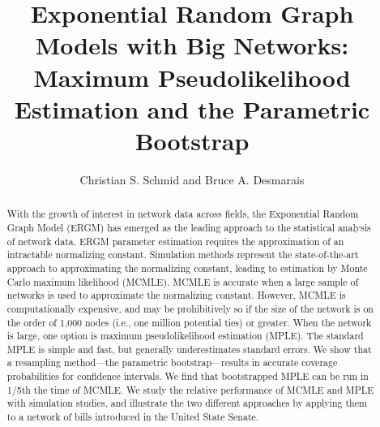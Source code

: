 \documentclass{llncs}
\begin{document}

\title{Exponential Random Graph Models with Big Networks: Maximum Pseudolikelihood Estimation and the Parametric Bootstrap}

\author{Christian S. Schmid and Bruce A. Desmarais}

\maketitle

\begin{abstract}
With the growth of interest in network data across fields, the Exponential Random Graph Model (ERGM) has emerged as the leading approach to the statistical analysis of network data. ERGM parameter estimation requires the approximation of an intractable normalizing constant. Simulation methods represent the state-of-the-art approach to approximating the normalizing constant, leading to estimation by Monte Carlo maximum likelihood (MCMLE). MCMLE is accurate when a large sample of networks is used to approximate the normalizing constant. However, MCMLE is computationally expensive, and may be prohibitively so if the size of the network is on the order of 1,000 nodes (i.e., one million potential ties) or greater. When the network is large, one option is maximum pseudolikelihood estimation (MPLE). The standard MPLE is simple and fast, but generally underestimates standard errors. We show that a resampling method---the parametric bootstrap---results in accurate coverage probabilities for confidence intervals. We find that bootstrapped MPLE can be run in 1/5th the time of MCMLE. We study the relative performance of MCMLE and MPLE with simulation studies, and illustrate the two different approaches by applying them to a network of bills introduced in the United State Senate. 

\end{abstract}
\end{document}
